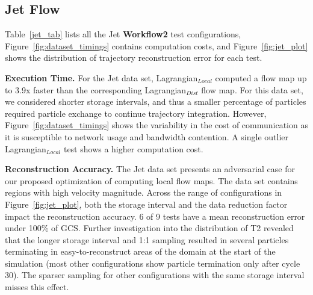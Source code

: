 


\subsection{Jet Flow}
\label{sec:jet}
Table~\ref{jet_tab} lists all the Jet \textbf{Workflow2} test configurations, Figure~\ref{fig:dataset_timings} contains computation costs, and Figure~\ref{fig:jet_plot} shows the distribution of trajectory reconstruction error for each test.
%


\textbf{Execution Time.} For the Jet data set, Lagrangian$_{Local}$ computed a flow map up to 3.9x faster than the corresponding Lagrangian$_{Dist}$ flow map.
%
For this data set, we considered shorter storage intervals, and thus a smaller percentage of particles required particle exchange to continue trajectory integration.
%
However, Figure~\ref{fig:dataset_timings} shows the variability in the cost of communication as it is susceptible to network usage and bandwidth contention.
%
A single outlier Lagrangian$_{Local}$ test shows a higher computation cost. 



\textbf{Reconstruction Accuracy.} The Jet data set presents an adversarial case for our proposed optimization of computing local flow maps.
%
The data set contains regions with high velocity magnitude.
%
Across the range of configurations in Figure~\ref{fig:jet_plot}, both the storage interval and the data reduction factor impact the reconstruction accuracy.
%
6 of 9 tests have a mean reconstruction error under 100\% of GCS. 
%
Further investigation into the distribution of T2 revealed that the longer storage interval and 1:1 sampling resulted in several particles terminating in easy-to-reconstruct areas of the domain at the start of the simulation (most other configurations show particle termination only after cycle 30).
%
The sparser sampling for other configurations with the same storage interval misses this effect.
%
%

